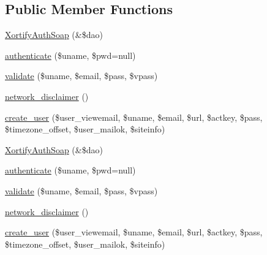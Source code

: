\subsection*{Public Member Functions}
\begin{DoxyCompactItemize}
\item 
\hyperlink{class_xortify_auth_soap_ad502760b81f77dd8f0ebdbfa04cbac9c}{Xortify\-Auth\-Soap} (\&\$dao)
\item 
\hyperlink{class_xortify_auth_soap_a00678ba307326b734e6c679f28bea315}{authenticate} (\$uname, \$pwd=null)
\item 
\hyperlink{class_xortify_auth_soap_a91121a1b702dfd20fb65a027c8ed26ec}{validate} (\$uname, \$email, \$pass, \$vpass)
\item 
\hyperlink{class_xortify_auth_soap_a1874c27b6f81a3f2ff9015405ad0f8bc}{network\-\_\-disclaimer} ()
\item 
\hyperlink{class_xortify_auth_soap_ac72efc5ad313a592cf6706876f56f7ec}{create\-\_\-user} (\$user\-\_\-viewemail, \$uname, \$email, \$url, \$actkey, \$pass, \$timezone\-\_\-offset, \$user\-\_\-mailok, \$siteinfo)
\item 
\hyperlink{class_xortify_auth_soap_ad502760b81f77dd8f0ebdbfa04cbac9c}{Xortify\-Auth\-Soap} (\&\$dao)
\item 
\hyperlink{class_xortify_auth_soap_a00678ba307326b734e6c679f28bea315}{authenticate} (\$uname, \$pwd=null)
\item 
\hyperlink{class_xortify_auth_soap_a91121a1b702dfd20fb65a027c8ed26ec}{validate} (\$uname, \$email, \$pass, \$vpass)
\item 
\hyperlink{class_xortify_auth_soap_a1874c27b6f81a3f2ff9015405ad0f8bc}{network\-\_\-disclaimer} ()
\item 
\hyperlink{class_xortify_auth_soap_ac72efc5ad313a592cf6706876f56f7ec}{create\-\_\-user} (\$user\-\_\-viewemail, \$uname, \$email, \$url, \$actkey, \$pass, \$timezone\-\_\-offset, \$user\-\_\-mailok, \$siteinfo)
\end{DoxyCompactItemize}
